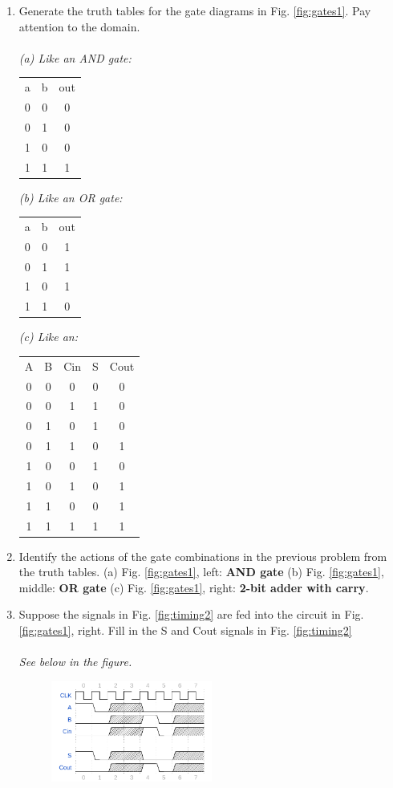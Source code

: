 \documentclass[10pt]{article}
\begin{document}
\begin{enumerate}
\item Generate the truth tables for the gate diagrams in Fig. \ref{fig:gates1}. Pay attention to the domain.  \\ \\
\textit{(a) Like an AND gate:}
\begin{tabular}{| c | c | c |}
a & b & out \\
0 & 0 & 0 \\
0 & 1 & 0 \\
1 & 0 & 0 \\
1 & 1 & 1 \\
\end{tabular}
\textit{(b) Like an OR gate:}
\begin{tabular}{| c | c | c |}
a & b & out \\
0 & 0 & 1 \\
0 & 1 & 1 \\
1 & 0 & 1 \\
1 & 1 & 0 \\
\end{tabular}
\textit{(c) Like an:}
\begin{tabular}{| c | c | c | c | c |}
A & B & Cin & S & Cout \\
0 & 0 & 0 & 0 & 0 \\
0 & 0 & 1 & 1 & 0 \\
0 & 1 & 0 & 1 & 0 \\
0 & 1 & 1 & 0 & 1 \\
1 & 0 & 0 & 1 & 0 \\
1 & 0 & 1 & 0 & 1 \\
1 & 1 & 0 & 0 & 1 \\
1 & 1 & 1 & 1 & 1 \\
\end{tabular}
\item Identify the actions of the gate combinations in the previous problem from the truth tables.  (a) Fig. \ref{fig:gates1}, left: \textbf{AND gate} (b) Fig. \ref{fig:gates1}, middle: \textbf{OR gate} (c) Fig. \ref{fig:gates1}, right: \textbf{2-bit adder with carry}.
\item Suppose the signals in Fig. \ref{fig:timing2} are fed into the circuit in Fig. \ref{fig:gates1}, right.  Fill in the S and Cout signals in Fig. \ref{fig:timing2} \\ \\
\textit{See below in the figure.}
\begin{figure}[ht]
\centering
\includegraphics[width=0.5\textwidth]{timingExample5.pdf}

\end{figure}
\end{enumerate}
\end{document}
